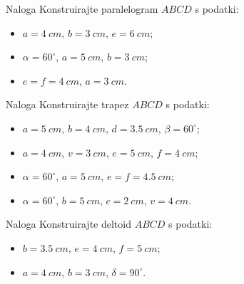         \begin{frame}
            \begin{exampleblock}{Naloga}
                Konstruirajte paralelogram $ABCD$ s podatki:
                \begin{itemize}
                    \item $a=4~cm$, $b=3~cm$, $e=6~cm$;
                    \item $\alpha=60^\circ$, $a=5~cm$, $b=3~cm$;
                    \item $e=f=4~cm$, $a=3~cm$.
                \end{itemize}
            \end{exampleblock}

            \begin{exampleblock}{Naloga}
                Konstruirajte trapez $ABCD$ s podatki:
                \begin{itemize}
                    \item $a=5~cm$, $b=4~cm$, $d=3.5~cm$, $\beta=60^\circ$;
                    \item $a=4~cm$, $v=3~cm$, $e=5~cm$, $f=4~cm$;
                    \item $\alpha=60^\circ$, $a=5~cm$, $e=f=4.5~cm$;
                    \item $\alpha=60^\circ$, $b=5~cm$, $c=2~cm$, $v=4~cm$.
                \end{itemize}
            \end{exampleblock}

        \end{frame}


        \begin{frame}
            \begin{exampleblock}{Naloga}
                Konstruirajte deltoid $ABCD$ s podatki:
                \begin{itemize}
                    \item $b=3.5~cm$, $e=4~cm$, $f=5~cm$;
                    \item $a=4~cm$, $b=3~cm$, $\delta=90^\circ$.
                \end{itemize}
            \end{exampleblock}

                
        \end{frame}



